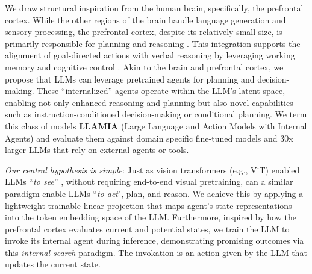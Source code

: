 \documentclass{article}
\newcommand{\somesh}[1]{\textcolor{red}{[Somesh: #1]}}
\theoremstyle{plain}
\theoremstyle{definition}
\theoremstyle{remark}
\begin{document}

We draw structural inspiration from the human brain, specifically, the prefrontal cortex. While the other regions of the brain handle language generation and sensory processing, the prefrontal cortex, despite its relatively small size, is primarily responsible for planning and reasoning \cite{friedman2022role,funahashi2017prefrontal}. This integration supports the alignment of goal-directed actions with verbal reasoning by leveraging working memory and cognitive control \cite{alderson2015inner}. Akin to the brain and prefrontal cortex, we propose that LLMs can leverage pretrained agents for planning and decision-making. These ``internalized'' agents operate within the LLM's latent space, enabling not only enhanced reasoning and planning but also novel capabilities such as instruction-conditioned decision-making or conditional planning. We term this class of models \textbf{LLAMIA} (Large Language and Action Models with Internal Agents) and evaluate them against domain specific fine-tuned models and 30x larger LLMs that rely on external agents or tools.

\textit{Our central hypothesis is simple}: Just as vision transformers (e.g., ViT) enabled LLMs ``\textit{to see}'' \cite{liu2023visual,li2023blip}, without requiring end-to-end visual pretraining, can a similar paradigm enable LLMs ``\textit{to act}", plan, and reason. 
We achieve this by applying a lightweight trainable linear projection that maps agent's state representations into the token embedding space of the LLM.
Furthermore, inspired by how the prefrontal cortex evaluates current and potential states, we train the LLM to invoke its internal agent during inference, demonstrating promising outcomes via this \textit{internal search} paradigm. The invokation is an action given by the LLM that updates the current state.
\end{document}
